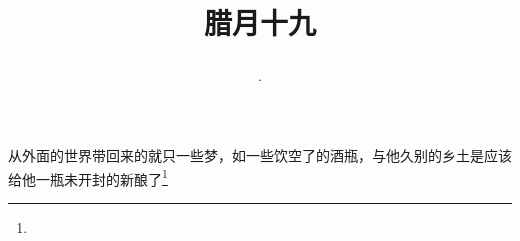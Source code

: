 \title{\date[d=29,m=1,y=2024][year:cn-y,年,month:cn,day:cn,日,·,weekday]·腊月十九 }
从外面的世界带回来的就只一些梦，如一些饮空了的酒瓶，与他久别的乡土是应该给他一瓶未开封的新酿了\footnote{ }

